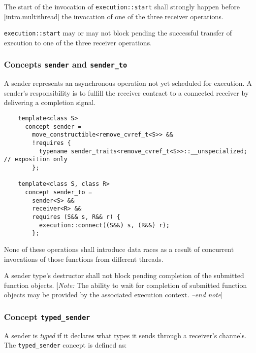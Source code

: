 \documentclass[a4paper,12pt,notitlepage,twoside,openright]{article}
\begin{document}
The start of the invocation of \texttt{execution::start}
shall strongly happen before {[}intro.multithread{]} the invocation of
one of the three receiver operations.

\texttt{execution::start} may or may not block pending the
successful transfer of execution to one of the three receiver
operations.

\hypertarget{concepts-sender-and-sender_to}{%
\subsubsection{\texorpdfstring{Concepts \texttt{sender} and
\texttt{sender_to}}{Concepts  and }}\label{concepts-sender-and-sender_to}}

A sender represents an asynchronous operation not yet scheduled for
execution. A sender's responsibility is to fulfill the receiver contract
to a connected receiver by delivering a completion signal.

\begin{verbatim}
    template<class S>
      concept sender =
        move_constructible<remove_cvref_t<S>> &&
        !requires {
          typename sender_traits<remove_cvref_t<S>>::__unspecialized; // exposition only
        };

    template<class S, class R>
      concept sender_to =
        sender<S> &&
        receiver<R> &&
        requires (S&& s, R&& r) {
          execution::connect((S&&) s, (R&&) r);
        };
\end{verbatim}

None of these operations shall introduce data races as a result of
concurrent invocations of those functions from different threads.

A sender type's destructor shall not block pending completion of the
submitted function objects. {[}\emph{Note:} The ability to wait for
completion of submitted function objects may be provided by the
associated execution context. \emph{--end note}{]}

\hypertarget{concept-typed_sender}{%
\subsubsection{\texorpdfstring{Concept
\texttt{typed_sender}}{Concept }}\label{concept-typed_sender}}

A sender is \emph{typed} if it declares what types it sends through a
receiver's channels. The \texttt{typed_sender} concept is
defined as:
\end{document}
